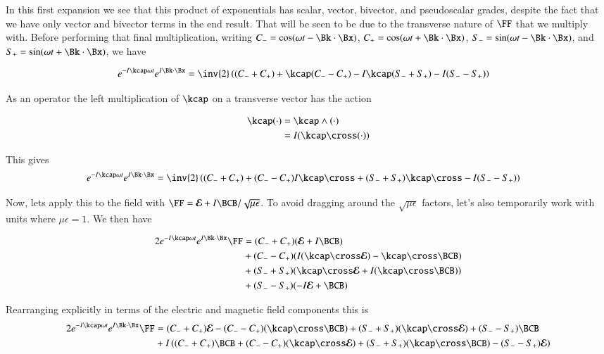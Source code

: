 In this first expansion we see that this product of exponentials has scalar, vector, bivector, and pseudoscalar grades, despite the fact that we have only
vector and bivector terms in the end result.  That will be seen to be due to the transverse nature of $\FF$ that we multiply with.  Before performing that final multiplication, writing $C_{-} = \cos(\omega t - \Bk \cdot \Bx)$, $C_{+} = \cos(\omega t + \Bk \cdot \Bx)$, $S_{-} = \sin(\omega t - \Bk \cdot \Bx)$, and $S_{+} = \sin(\omega t + \Bk \cdot \Bx)$, we have 

\begin{align}\label{eqn:transverseWave:fooH}
e^{ -I \kcap \omega t } e^{ I \Bk \cdot \Bx }
&=
\inv{2}
\left( 
(C_{-} + C_{+})
+\kcap (C_{-} - C_{+})
-I \kcap (S_{-} + S_{+})
-I (S_{-} - S_{+})
\right)
\end{align}

As an operator the left multiplication of $\kcap$ on a transverse vector has the action

\begin{align*}
\kcap ( \cdot ) 
&= \kcap \wedge (\cdot) \\
&= I (\kcap \cross (\cdot)) \\
\end{align*}

This gives
\begin{align}\label{eqn:transverseWave:fooI}
e^{ -I \kcap \omega t } e^{ I \Bk \cdot \Bx }
&=
\inv{2}
\left( 
(C_{-} + C_{+})
+(C_{-} - C_{+}) I \kcap \cross
+(S_{-} + S_{+}) \kcap \cross
-I (S_{-} - S_{+})
\right)
\end{align}

Now, lets apply this to the field with $\FF = \EE + I\BCB/\sqrt{\mu\epsilon}$.  To avoid dragging around the $\sqrt{\mu\epsilon}$ factors, let's also temporarily
work with units where $\mu\epsilon = 1$.  We then have

\begin{align*}
2 e^{ -I \kcap \omega t } e^{ I \Bk \cdot \Bx } \FF
&= (C_{-} + C_{+}) (\EE + I\BCB) \\
&+ (C_{-} - C_{+}) (I (\kcap \cross \EE) - \kcap \cross \BCB) \\
&+ (S_{-} + S_{+}) (\kcap \cross \EE +I (\kcap \cross \BCB))  \\
&+ (S_{-} - S_{+}) (-I \EE + \BCB) 
\end{align*}

Rearranging explicitly in terms of the electric and magnetic field components this is
\begin{align*}
2 e^{ -I \kcap \omega t } e^{ I \Bk \cdot \Bx } \FF
&=
 (C_{-} + C_{+}) \EE 
-(C_{-} - C_{+}) (\kcap \cross \BCB)
+(S_{-} + S_{+}) (\kcap \cross \EE)
+(S_{-} - S_{+}) \BCB \\
&+{I}
\left( 
 (C_{-} + C_{+}) \BCB
+(C_{-} - C_{+}) (\kcap \cross \EE)
+(S_{-} + S_{+}) (\kcap \cross \BCB)
-(S_{-} - S_{+}) \EE 
\right) \\
\end{align*}


